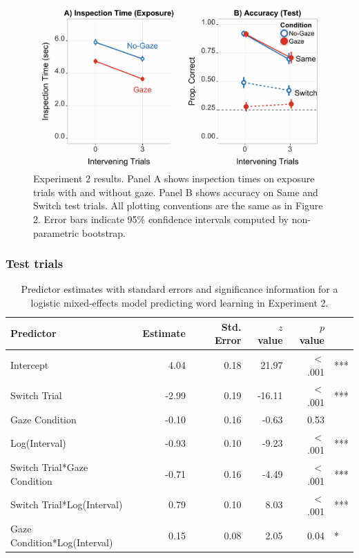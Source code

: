\documentclass[authoryear, review]{elsarticle}
\newenvironment{CodeChunk}{}{}
\begin{document}
\begin{CodeChunk}
\begin{figure}[tb]

{\centering \includegraphics[width=0.8\linewidth]{figs/expt2-plot-1} 

}

\caption[Experiment 2 results]{Experiment 2 results. Panel A shows inspection times on exposure trials with and without gaze. Panel B shows accuracy on Same and Switch test trials. All plotting conventions are the same as in Figure 2. Error bars indicate 95\% confidence intervals computed by non-parametric bootstrap.}\label{fig:expt2-plot}
\end{figure}
\end{CodeChunk}

\subsubsection{Test trials}\label{test-trials-1}

\begin{table}[tb]
\centering
\begin{tabular}{lrrrrl}
 Predictor & Estimate & Std. Error & $z$ value & $p$ value &  \\ 
  \hline
Intercept & 4.04 & 0.18 & 21.97 & $<$ .001 & *** \\ 
  Switch Trial & -2.99 & 0.19 & -16.11 & $<$ .001 & *** \\ 
  Gaze Condition & -0.10 & 0.16 & -0.63 & 0.53 &  \\ 
  Log(Interval) & -0.93 & 0.10 & -9.23 & $<$ .001 & *** \\ 
  Switch Trial*Gaze Condition & -0.71 & 0.16 & -4.49 & $<$ .001 & *** \\ 
  Switch Trial*Log(Interval) & 0.79 & 0.10 & 8.03 & $<$ .001 & *** \\ 
  Gaze Condition*Log(Interval) & 0.15 & 0.08 & 2.05 & 0.04 & * \\ 
   \hline
\end{tabular}
\caption{Predictor estimates with standard errors and significance information for a logistic mixed-effects model predicting word learning in Experiment 2.} 
\label{tab:exp2_reg}
\end{table}
\end{document}
